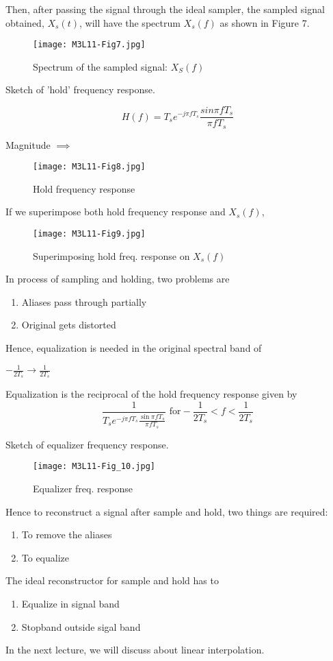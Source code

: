 Then, after passing the signal through the ideal sampler, the sampled signal obtained, $X_s(t)$, will have the spectrum $X_s(f)$ as shown in Figure 7.


\begin{figure}[ht]
\centering
\texttt{[image: M3L11-Fig7.jpg]}
\caption{\label{Fig:7} Spectrum of the sampled signal: $X_{S}(f)$}
\end{figure}

Sketch of 'hold' frequency response.

$$ H(f) = T_s e^{-j \pi fT_s}\frac{sin \pi fT_s}{\pi fT_s}$$

Magnitude $\implies$

\begin{figure}[ht]
\centering
\texttt{[image: M3L11-Fig8.jpg]}
\caption{\label{Fig:8} Hold frequency response}
\end{figure}

If we superimpose both hold frequency response and $X_s(f)$,

\begin{figure}[ht]
\centering
\texttt{[image: M3L11-Fig9.jpg]}
\caption{\label{Fig:9} Superimposing hold freq. response on $X_{s}(f)$}
\end{figure}


In process of sampling and holding, two problems are
\begin{enumerate}
\item Aliases pass through partially
\item Original gets distorted
\end{enumerate}


Hence, equalization is needed in the original spectral band of

$-\frac{1}{2T_s} \rightarrow \frac{1}{2T_s}$

Equalization is the reciprocal of the hold frequency response given by\\
{\large
$$\frac{1}{T_s e^{-j \pi f T_s}\frac{\sin \pi fT_s}{\pi f T_s}}
\mbox{  for} -\frac{1}{2T_s} < f <  \frac{1}{2 T_s}$$
}
\newpage

Sketch of equalizer frequency response.

\begin{figure}[ht]
\centering
\texttt{[image: M3L11-Fig\_10.jpg]}
\caption{\label{Fig:10} Equalizer freq. response}
\end{figure}


Hence to reconstruct a signal after sample and hold, two things are required:
\begin{enumerate}
\item To remove the aliases
\item To equalize
\end{enumerate}

The ideal reconstructor for sample and hold has to
\begin{enumerate}
\item Equalize in signal band
\item Stopband outside sigal band
\end{enumerate}

In the next lecture, we will discuss about linear interpolation.


